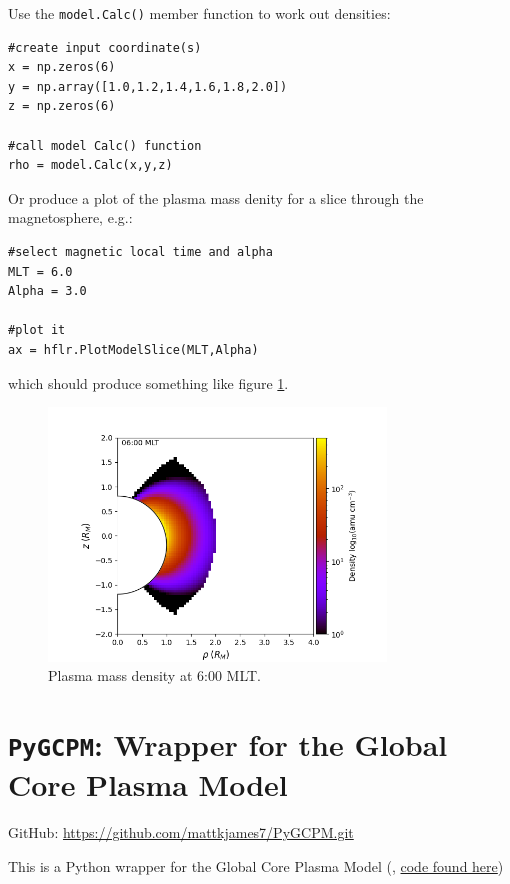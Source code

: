 			Use the \texttt{model.Calc()} member function to work out densities:
			\begin{verbatim}
#create input coordinate(s)
x = np.zeros(6)
y = np.array([1.0,1.2,1.4,1.6,1.8,2.0])
z = np.zeros(6)

#call model Calc() function
rho = model.Calc(x,y,z)
			\end{verbatim}

			Or produce a plot of the plasma mass denity for a slice through the magnetosphere, e.g.:
			\begin{verbatim}
#select magnetic local time and alpha
MLT = 6.0
Alpha = 3.0

#plot it
ax = hflr.PlotModelSlice(MLT,Alpha)
			\end{verbatim}
			which should produce something like figure \ref{FigHFLR}.

			\begin{figure}
				\begin{center}
					\includegraphics[width=0.8\textwidth]{figures/ch2_hflr.png}
				\end{center}
				\caption{Plasma mass density at 6:00 MLT. \label{FigHFLR}}
			\end{figure}



	\section{\texttt{PyGCPM}: Wrapper for the Global Core Plasma Model}
	
		GitHub: \href{https://github.com/mattkjames7/PyGCPM.git}{https://github.com/mattkjames7/PyGCPM.git}

		This is a Python wrapper for the Global Core Plasma Model (\citet{Gallagher2000}, \href{https://plasmasphere.nasa.gov/models/}{code found here})

